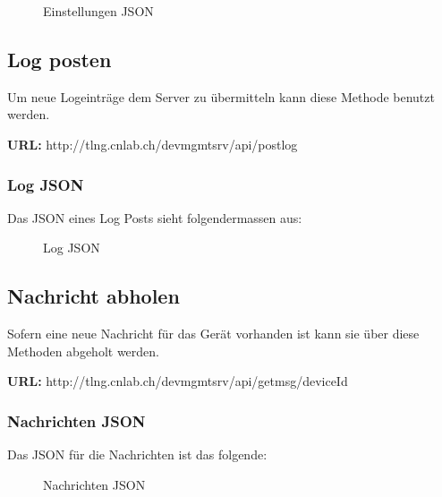 \begin{figure}[H]
	\centering
	
	\caption{Einstellungen JSON}
\end{figure}


\subsection{Log posten}

Um neue Logeinträge dem Server zu übermitteln kann diese Methode benutzt werden.

{\bf URL: }http://tlng.cnlab.ch/devmgmtsrv/api/postlog

\subsubsection{Log JSON}

Das JSON eines Log Posts sieht folgendermassen aus:

\begin{figure}[H]
	\centering
	
	\caption{Log JSON}
\end{figure}

\subsection{Nachricht abholen}

Sofern eine neue Nachricht für das Gerät vorhanden ist kann sie über diese Methoden abgeholt werden.

{\bf URL: }http://tlng.cnlab.ch/devmgmtsrv/api/getmsg/{deviceId}

\subsubsection{Nachrichten JSON}
Das JSON für die Nachrichten ist das folgende:
\begin{figure}[H]
	\centering
	
	\caption{Nachrichten JSON}
\end{figure}


